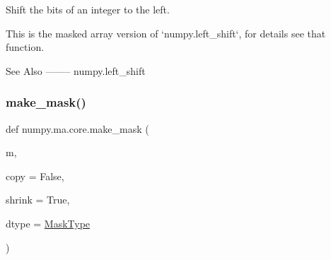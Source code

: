\begin{DoxyVerb}Shift the bits of an integer to the left.

This is the masked array version of `numpy.left_shift`, for details
see that function.

See Also
--------
numpy.left_shift\end{DoxyVerb}
 \mbox{\label{namespacenumpy_1_1ma_1_1core_ae69f2f8cd3d14437f8e15810fe8be738}} 
\subsubsection{\texorpdfstring{make\+\_\+mask()}{make\_mask()}}
{\footnotesize\ttfamily def numpy.\+ma.\+core.\+make\+\_\+mask (\begin{DoxyParamCaption}\item[{}]{m,  }\item[{}]{copy = {\ttfamily False},  }\item[{}]{shrink = {\ttfamily True},  }\item[{}]{dtype = {\ttfamily \hyperlink{namespacenumpy_1_1ma_1_1core_acc6b89c85d288395d69165107e312c4e}{Mask\+Type}} }\end{DoxyParamCaption})}


